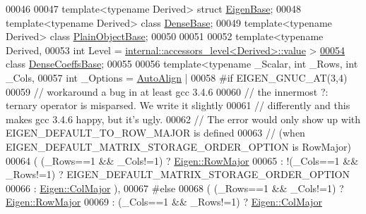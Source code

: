 \begin{DoxyCode}
00046 
00047 \textcolor{keyword}{template}<\textcolor{keyword}{typename} Derived> \textcolor{keyword}{struct }\hyperlink{group___core___module_struct_eigen_1_1_eigen_base}{EigenBase};
00048 \textcolor{keyword}{template}<\textcolor{keyword}{typename} Derived> \textcolor{keyword}{class }\hyperlink{group___core___module_class_eigen_1_1_dense_base}{DenseBase};
00049 \textcolor{keyword}{template}<\textcolor{keyword}{typename} Derived> \textcolor{keyword}{class }\hyperlink{class_eigen_1_1_plain_object_base}{PlainObjectBase};
00050 
00051 
00052 \textcolor{keyword}{template}<\textcolor{keyword}{typename} Derived,
00053          \textcolor{keywordtype}{int} Level = \hyperlink{struct_eigen_1_1internal_1_1accessors__level}{internal::accessors\_level<Derived>::value} >
\hyperlink{class_eigen_1_1_dense_coeffs_base}{00054} \textcolor{keyword}{class }\hyperlink{class_eigen_1_1_dense_coeffs_base}{DenseCoeffsBase};
00055 
00056 \textcolor{keyword}{template}<\textcolor{keyword}{typename} \_Scalar, \textcolor{keywordtype}{int} \_Rows, \textcolor{keywordtype}{int} \_Cols,
00057          \textcolor{keywordtype}{int} \_Options = \hyperlink{group__enums_ggaacded1a18ae58b0f554751f6cdf9eb13a28d63c0dd8560827162decfd898804f4}{AutoAlign} |
00058 \textcolor{preprocessor}{#if EIGEN\_GNUC\_AT(3,4)}
00059     \textcolor{comment}{// workaround a bug in at least gcc 3.4.6}
00060     \textcolor{comment}{// the innermost ?: ternary operator is misparsed. We write it slightly}
00061     \textcolor{comment}{// differently and this makes gcc 3.4.6 happy, but it's ugly.}
00062     \textcolor{comment}{// The error would only show up with EIGEN\_DEFAULT\_TO\_ROW\_MAJOR is defined}
00063     \textcolor{comment}{// (when EIGEN\_DEFAULT\_MATRIX\_STORAGE\_ORDER\_OPTION is RowMajor)}
00064                           ( (\_Rows==1 && \_Cols!=1) ? \hyperlink{group__enums_ggaacded1a18ae58b0f554751f6cdf9eb13acfcde9cd8677c5f7caf6bd603666aae3}{Eigen::RowMajor}
00065                           : !(\_Cols==1 && \_Rows!=1) ?  EIGEN\_DEFAULT\_MATRIX\_STORAGE\_ORDER\_OPTION
00066                           : \hyperlink{group__enums_ggaacded1a18ae58b0f554751f6cdf9eb13a0cbd4bdd0abcfc0224c5fcb5e4f6669a}{Eigen::ColMajor} ),
00067 #\textcolor{keywordflow}{else}
00068                           ( (\_Rows==1 && \_Cols!=1) ? \hyperlink{group__enums_ggaacded1a18ae58b0f554751f6cdf9eb13acfcde9cd8677c5f7caf6bd603666aae3}{Eigen::RowMajor}
00069                           : (\_Cols==1 && \_Rows!=1) ? \hyperlink{group__enums_ggaacded1a18ae58b0f554751f6cdf9eb13a0cbd4bdd0abcfc0224c5fcb5e4f6669a}{Eigen::ColMajor}

\end{DoxyCode}
